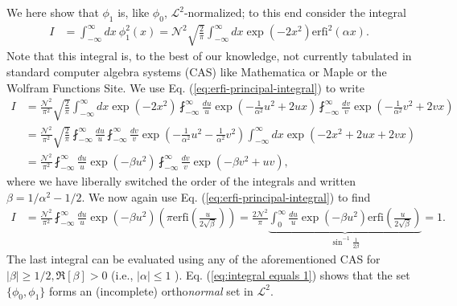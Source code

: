 \documentclass[11pt,letterpaper]{article}
\newcommand{\eq}[1]{\begin{align}#1\end{align}}
\newcommand{\erfi}{\text{erfi}}
\begin{document}
We here show that $\phi_1$ is, like $\phi_0$, $\mathcal{L}^2$-normalized; to this end consider the integral
\eq{
  I&=\int_{-\infty}^\infty dx \ \phi_1^2\left(x\right) =\mathcal{N}^2\sqrt{\frac{2}{\pi}}\int_{-\infty}^\infty dx  \exp\left(-2x^2\right)\erfi^2\left(\alpha x\right).
}
Note that this integral is, to the best of our knowledge, not currently tabulated in standard computer algebra systems (CAS) like Mathematica or Maple or the Wolfram Functions Site. 
We use Eq. (\ref{eq:erfi-principal-integral}) to write
\begin{subequations}
\eq{
  I&=\frac{\mathcal{N}^2}{\pi^2}\sqrt{\frac{2}{\pi}}\int_{-\infty}^\infty dx\exp\left(-2x^2\right)\fint_{-\infty}^\infty \frac{du}{u} \exp\left(-\frac{1}{\alpha^2}u^2+2ux\right)\fint_{-\infty}^\infty \frac{dv}{v} \exp\left(-\frac{1}{\alpha^2}v^2+2vx\right)\\
  &=\frac{\mathcal{N}^2}{\pi^2}\sqrt{\frac{2}{\pi}}\fint_{-\infty}^\infty \frac{du}{u}\fint_{-\infty}^\infty \frac{dv}{v}
  \exp\left(-\frac{1}{\alpha^2}u^2-\frac{1}{\alpha^2}v^2\right) \int_{-\infty}^\infty dx \exp\left(-2x^2+2ux+2vx\right)\\
  &=\frac{\mathcal{N}^2}{\pi^2}\fint_{-\infty}^\infty \frac{du}{u}\exp\left(-\beta u^2\right)\fint_{-\infty}^\infty \frac{dv}{v}
  \exp\left(-\beta v^2+uv\right),
}
\end{subequations}
where we have liberally switched the order of the integrals and written $\beta=1/\alpha^2-1/2$. We now again use Eq. (\ref{eq:erfi-principal-integral}) to find
\eq{
  I&=\frac{\mathcal{N}^2}{\pi^2}\fint_{-\infty}^\infty \frac{du}{u}\exp\left(-\beta u^2\right)\left(\pi\erfi\left(\frac{u}{2\sqrt{\beta}}\right)\right)
  =\frac{2\mathcal{N}^2}{\pi}\underbrace{\int_{0}^\infty \frac{du}{u}\exp\left(-\beta u^2\right)\erfi\left(\frac{u}{2\sqrt{\beta}}\right)}_{\sin^{-1}\frac{1}{2\beta}}
  =1.
  \label{eq:integral equals 1}
}
The last integral can be evaluated using any of the aforementioned CAS for $\left|\beta\right|\geq1/2,\Re\left[\beta\right]>0$ (i.e., $\left|\alpha\right|\leq 1$%
). Eq. (\ref{eq:integral equals 1}) shows that the set $\{\phi_0,\phi_1 \}$ forms an (incomplete) ortho\emph{normal} set in $\mathcal{L}^2$.
\end{document}
